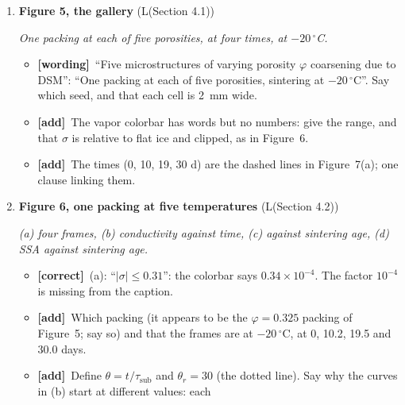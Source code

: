 \documentclass[11pt]{article}
\newcommand{\Pg}[3]{\item \textbf{#1} {\small(#2)}\par\textit{#3}}
\newcommand{\tC}{\textcolor{miss}{\textbf{[correct]}}\ }
\newcommand{\tG}{\textcolor{stale}{\textbf{[wording]}}\ }
\newcommand{\tA}{\textcolor{have}{\textbf{[add]}}\ }
\begin{document}
\begin{enumerate}
\begin{itemize}
  \item \tA \textbf{Why the pore is red.} $\sigma$ is relative to flat ice,
    and Section~3.2 sets the far field to the Gibbs--Thomson value of the
    grains, $2d_0/R \approx 2.4\times10^{-5}$ for $R = 84~\mu$m, the top of
    the scale. Say this; a reader expects a saturated pore to be white.
  \item \tA The legend: $C(t+t_0)^{a}$, $a = 0.29$, and $C(t+t_0)^{1/3}$.
    Say both are fitted ($t_0$ free), over 20~min to 150~h; temperature
    $-20\,^{\circ}$C, $R = 84.4~\mu$m, $\alpha_c = 10^{-3}$; the numbered
    circles mark the frames in (a). Cite Demmenie et al.\ for the measured
    range and Appendix~B for the 0.29 prediction.
  \item \tG ``An isolated ice grain pair shown undergoing sintering shown'':
    ``Two equal ice grains sintering in saturated air, at $t = 0$ (left)
    and 150~h (right)''. ``filed'', ``the the''.
  \end{itemize}
\Pg{Figure 5, the gallery}{L(Section 4.1)}{One packing at each of five porosities, at four times, at $-20\,^{\circ}$C.}
  \begin{itemize}
  \item \tG ``Five microstructures of varying porosity $\varphi$ coarsening
    due to DSM'': ``One packing at each of five porosities, sintering at
    $-20\,^{\circ}$C''. Say which seed, and that each cell is 2~mm wide.
  \item \tA The vapor colorbar has words but no numbers: give the range, and
    that $\sigma$ is relative to flat ice and clipped, as in Figure~6.
  \item \tA The times (0, 10, 19, 30 d) are the dashed lines in
    Figure~7(a); one clause linking them.
  \end{itemize}
\Pg{Figure 6, one packing at five temperatures}{L(Section 4.2)}{(a) four frames, (b) conductivity against time, (c) against sintering age, (d) SSA against sintering age.}
  \begin{itemize}
  \item \tC (a): ``$|\sigma| \le 0.31$'': the colorbar says
    $0.34\times10^{-4}$. The factor $10^{-4}$ is missing from the caption.
  \item \tA Which packing (it appears to be the $\varphi = 0.325$ packing of
    Figure~5; say so) and that the frames are at $-20\,^{\circ}$C, at 0,
    10.2, 19.5 and 30.0 days.
  \item \tA Define $\theta = t/\tau_{\mathrm{sub}}$ and $\theta_r = 30$ (the
    dotted line). Say why the curves in (b) start at different values: each

\end{itemize}
\end{enumerate}
\end{document}
